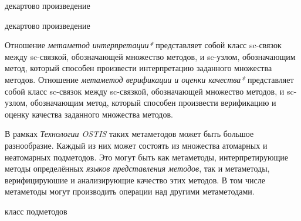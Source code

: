 \begin{SCn}
\begin{scnindent}
    \begin{scnreltovector}{декартово произведение}
    \end{scnreltovector}
\end{scnindent}
\begin{scnindent}
    \begin{scnreltovector}{декартово произведение}
    \end{scnreltovector}
\end{scnindent}
\end{SCn}

Отношение \textit{метаметод интерпретации*} представляет собой класс sc-связок между sc-связкой, обозначающей множество методов, и sc-узлом, обозначающим метод, который способен произвести интерпретацию заданного множества методов.
Отношение \textit{метаметод верификации и оценки качества*} представляет собой класс sc-связок между sc-связкой, обозначающей множество методов, и sc-узлом, обозначающим метод, который способен произвести верификацию и оценку качества заданного множества методов.

В рамках \textit{Технологии OSTIS} таких метаметодов может быть большое разнообразие. Каждый из них может состоять из множества атомарных и неатомарных подметодов. Это могут быть как метаметоды, интерпретирующие методы определённых \textit{языков представления методов}, так и метаметоды, верифицируюшие и анализирующие качество этих методов. В том числе метаметоды могут производить операции над другими метаметодами.

\begin{SCn}
\begin{scnrelfromlist}{класс подметодов}
\end{scnrelfromlist}
\end{SCn}


